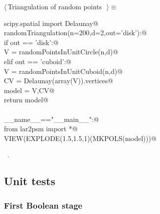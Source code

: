\documentclass[11pt,oneside]{article}	%
\begin{document}
\begin{flushleft} \small \label{scrap21}
$\langle\,$Triangulation of random points\nobreak\ {\footnotesize {}}$\,\rangle\equiv$
\vspace{-1ex}
\begin{list}{}{} \item
\mbox{}\verb@from scipy.spatial import Delaunay@\\
\mbox{}\verb@def randomTriangulation(n=200,d=2,out='disk'):@\\
\mbox{}\verb@   if out == 'disk':@\\
\mbox{}\verb@      V = randomPointsInUnitCircle(n,d)@\\
\mbox{}\verb@   elif out == 'cuboid':@\\
\mbox{}\verb@      V = randomPointsInUnitCuboid(n,d)@\\
\mbox{}\verb@   CV = Delaunay(array(V)).vertices@\\
\mbox{}\verb@   model = V,CV@\\
\mbox{}\verb@   return model@\\
\mbox{}\verb@@\\
\mbox{}\verb@if __name__=="__main__":@\\
\mbox{}\verb@   from lar2psm import *@\\
\mbox{}\verb@   VIEW(EXPLODE(1.5,1.5,1)(MKPOLS(model)))@\\
\mbox{}\verb@@{\NWsep}
\end{list}
\vspace{-1ex}
\footnotesize\addtolength{\baselineskip}{-1ex}
\begin{list}{}{\setlength{\itemsep}{-\parsep}\setlength{\itemindent}{-\leftmargin}}
\item \NWtxtMacroRefIn\ .
\end{list}
\end{flushleft}
\subsection{Unit tests}

\subsubsection{First Boolean stage}
\end{document}
